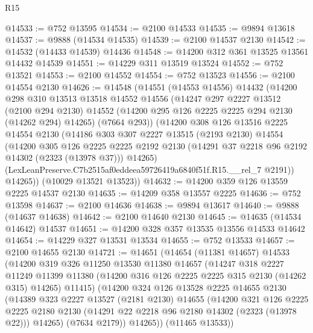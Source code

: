 \begin{lexlean}{R15}
\begin{coremodule}
@14533 := @752 @13595
@14534 := @2100 @14533
@14535 := @9894 @13618
@14537 := @9888 (@14534 @14535)
@14539 := @2100 @14537 @2130
@14542 := @14532 (@14433 @14539) @14436
@14548 := @14200 @312 @361 @13525 @13561 @14432 @14539
@14551 := @14229 @311 @13519 @13524
@14552 := @752 @13521
@14553 := @2100 @14552
@14554 := @752 @13523
@14556 := @2100 @14554 @2130
@14626 := @14548
    (@14551
      (@14553 @14556)
      @14432
      (@14200
        @298
        @310
        @13513
        @13518
        @14552
        @14556
        (@14247
          @297
          @2227
          @13512
          (@2100 @294 @2130)
          @14552
          (@14200 @295 @126 @2225 @2225 @294 @2130 (@14262 @294) @14265)
          (@7664 @293))
        (@14200
          @308
          @126
          @13516
          @2225
          @14554
          @2130
          (@14186
            @303
            @307
            @2227
            @13515
            (@2193 @2130)
            @14554
            (@14200
              @305
              @126
              @2225
              @2225
              @2192
              @2130
              (@14291 @37 @2218 @96 @2192 @14302 (@2323 (@13978 @37)))
              @14265)
            (LexLeanPreserve.C7b2515af0eddeea59726419a6840f51f.R15.__rel_7 @2191))
          @14265))
      (@10029 @13521 @13523))
@14632 := @14200 @359 @126 @13559 @2225 @14537 @2130
@14635 := @14209 @358 @13557 @2225
@14636 := @752 @13598
@14637 := @2100 @14636
@14638 := @9894 @13617
@14640 := @9888 (@14637 @14638)
@14642 := @2100 @14640 @2130
@14645 := @14635 (@14534 @14642) @14537
@14651 := @14200 @328 @357 @13535 @13556 @14533 @14642
@14654 := @14229 @327 @13531 @13534
@14655 := @752 @13533
@14657 := @2100 @14655 @2130
@14721 := @14651
    (@14654
      (@11381 @14657)
      @14533
      (@14200
        @319
        @326
        @11250
        @13530
        @11380
        @14657
        (@14247
          @318
          @2227
          @11249
          @11399
          @11380
          (@14200 @316 @126 @2225 @2225 @315 @2130 (@14262 @315) @14265)
          @11415)
        (@14200
          @324
          @126
          @13528
          @2225
          @14655
          @2130
          (@14389
            @323
            @2227
            @13527
            (@2181 @2130)
            @14655
            (@14200
              @321
              @126
              @2225
              @2225
              @2180
              @2130
              (@14291 @22 @2218 @96 @2180 @14302 (@2323 (@13978 @22)))
              @14265)
            (@7634 @2179))
          @14265))
      (@11465 @13533))

\end{coremodule}
\end{lexlean}
